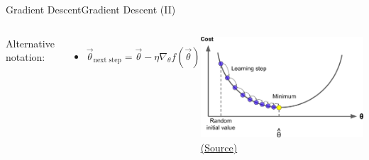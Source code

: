\documentclass[10pt,compress]{beamer} %
\begin{document}
\begin{frame}{Gradient Descent}{Gradient Descent (II)}
	\begin{columns}[c]
		Alternative notation: 
		\begin{itemize}
		\item[] $\vec{\theta}_{\text{next step}} = \vec{\theta} - \eta \nabla_{\theta} f(\vec{\theta})$
		\end{itemize}

		\centering
		\includegraphics[width=\linewidth]{figs/gradient_descent.png}\\
		\scriptsize \href{http://uc-r.github.io/gbm_regression}{(Source)}
	\end{columns}
\end{frame}
\end{document}
